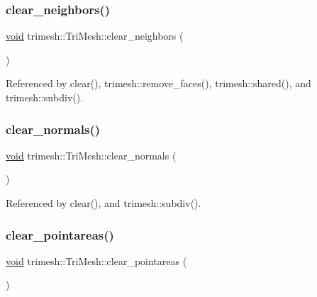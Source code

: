 \subsubsection{\texorpdfstring{clear\+\_\+neighbors()}{clear\_neighbors()}}
{\footnotesize\ttfamily \hyperlink{namespacetrimesh_a784ddfd979e1c579bda795a8edfc3f43}{void} trimesh\+::\+Tri\+Mesh\+::clear\+\_\+neighbors (\begin{DoxyParamCaption}{ }\end{DoxyParamCaption})\hspace{0.3cm}{\ttfamily [inline]}}



Referenced by clear(), trimesh\+::remove\+\_\+faces(), trimesh\+::shared(), and trimesh\+::subdiv().

\mbox{\label{classtrimesh_1_1TriMesh_a1204da05525430aa5dcca09d2e6c34ec}} 
\subsubsection{\texorpdfstring{clear\+\_\+normals()}{clear\_normals()}}
{\footnotesize\ttfamily \hyperlink{namespacetrimesh_a784ddfd979e1c579bda795a8edfc3f43}{void} trimesh\+::\+Tri\+Mesh\+::clear\+\_\+normals (\begin{DoxyParamCaption}{ }\end{DoxyParamCaption})\hspace{0.3cm}{\ttfamily [inline]}}



Referenced by clear(), and trimesh\+::subdiv().

\mbox{\label{classtrimesh_1_1TriMesh_a274e2b66ea228b953707d5be1292d6b4}} 
\subsubsection{\texorpdfstring{clear\+\_\+pointareas()}{clear\_pointareas()}}
{\footnotesize\ttfamily \hyperlink{namespacetrimesh_a784ddfd979e1c579bda795a8edfc3f43}{void} trimesh\+::\+Tri\+Mesh\+::clear\+\_\+pointareas (\begin{DoxyParamCaption}{ }\end{DoxyParamCaption})\hspace{0.3cm}{\ttfamily [inline]}}



